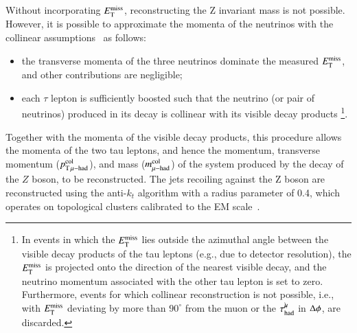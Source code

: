         Without incorporating $E_{\text{T}}^{\text{miss}}$, reconstructing the Z invariant mass is not possible. However, it is possible to approximate 
        the momenta of the neutrinos with the collinear assumptions~\cite{ELLIS1988221} as follows:
        \begin{itemize}
            \item the transverse momenta of the three neutrinos dominate the measured $E_{\text{T}}^{\text{miss}}$, and other contributions are negligible;
            \item each $\tau$ lepton is sufficiently boosted such that the neutrino (or pair of neutrinos) produced in its decay is collinear with its visible decay products
            \footnote{In events in which the $E_{\text{T}}^{\text{miss}}$ lies outside the azimuthal angle 
                between the visible decay products of the tau leptons (e.g., due to detector resolution), the 
                $E_{\text{T}}^{\text{miss}}$ is projected onto the direction of the nearest visible decay, and the neutrino momentum 
                associated with the other tau lepton is set to zero. Furthermore, events for which collinear 
                reconstruction is not possible, i.e., with $E_{\text{T}}^{\text{miss}}$ deviating by more than $90^{\circ}$ from the muon 
                or the $\tau_\mathrm{had}^{\mu\mkern-10mu\backslash}$ in $\Delta \phi$, are discarded.}.
        \end{itemize}
        Together with the momenta of the visible decay products, this procedure allows the momenta of 
        the two tau leptons, and hence the momentum, transverse momentum ($p_{\mathrm{T}\,\mu\mathrm{-}\mathrm{had}}^\mathrm{col}$), and mass ($m_{\mu\mathrm{-}\mathrm{had}}^\mathrm{col}$) 
        of the system produced by the decay of the $Z$ boson, to be reconstructed.
        The jets recoiling against the Z boson are reconstructed using the anti-$k_t$ algorithm with a radius 
        parameter of 0.4, which operates on topological clusters calibrated to the EM scale~\cite{JETM-2018-05}.
